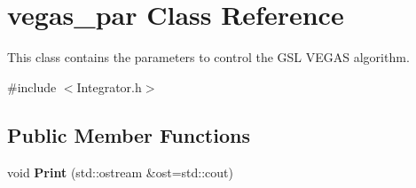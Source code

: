 \hypertarget{classvegas__par}{}\section{vegas\+\_\+par Class Reference}
\label{classvegas__par}


This class contains the parameters to control the G\+S\+L V\+E\+G\+A\+S algorithm.  




{\ttfamily \#include $<$Integrator.\+h$>$}

\subsection*{Public Member Functions}
\begin{DoxyCompactItemize}
\item 
\hypertarget{classvegas__par_a730b059d3c70a835152ca7b012e6c267}{}void {\bfseries Print} (std\+::ostream \&ost=std\+::cout)\label{classvegas__par_a730b059d3c70a835152ca7b012e6c267}

\end{DoxyCompactItemize}

